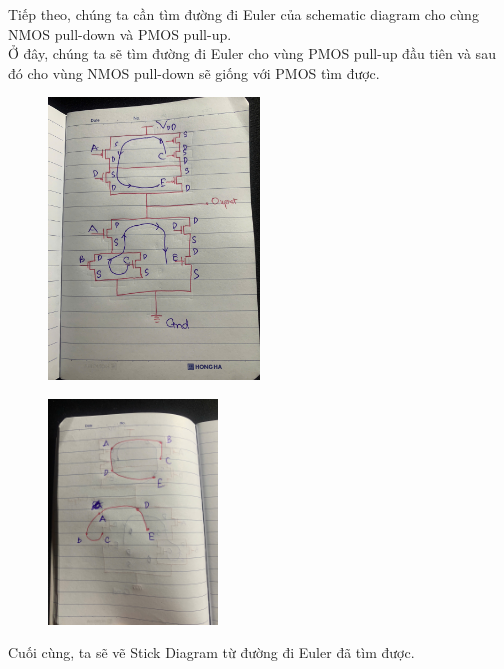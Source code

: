 \documentclass[a4paper,12pt]{article}
\begin{document}
Tiếp theo, chúng ta cần tìm đường đi Euler của schematic diagram cho cùng NMOS pull-down và PMOS pull-up.\\
Ở đây, chúng ta sẽ tìm đường đi Euler cho vùng PMOS pull-up đầu tiên và sau đó cho vùng NMOS pull-down sẽ giống với PMOS tìm được.\\

\begin{figure}[H]
    \centering
    \includegraphics[width=0.5\textwidth]{../PNG/Euler_CMOS.jpg}
    \label{fig:Ex_Schematic}\\
\end{figure}

\begin{figure}[H]
    \centering
    \includegraphics[width=0.4\textwidth]{../PNG/Euler_alone.jpg}
    \label{fig:Ex_Schematic}\\
\end{figure}

Cuối cùng, ta sẽ vẽ Stick Diagram từ đường đi Euler đã tìm được.\\
\end{document}
